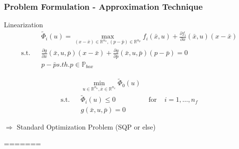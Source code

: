 \begin{frame}
	\frametitle{Problem Formulation - Approximation Technique}

\begin{block}{Linearization}
	\begin{align*}
	&&&\tilde{\Phi}_{i}(u)=\max_{(x-\bar{x})\in\mathbb{R}^{n_{x}}, (p-\bar{p})\in\mathbb{R}^{n_{p}}} f_{i}(\bar{x}, u)+\frac{\partial f_{i}}{\partial x}(\bar{x}, u)(x-\bar{x})\\
	&\text{s.t.} && \frac{\partial g}{\partial x}(\bar{x}, u, \bar{p})(x-\bar{x})+\frac{\partial g}{\partial p}(\bar{x}, u, \bar{p})(p-\bar{p})=0\\
	&&&p-\bar{p} s.th. p\in\mathbb{P}_{box}
	\end{align*}
	
\end{block}	
	

	
\begin{block}	

\begin{align*}
&&&\min_{u\in\mathbb{R}^{n_{u}}, \bar{x}\in\mathbb{R}^{n_{x}}} \tilde{\Phi}_{0}(u)\\
&\text{s.t.} &&  \tilde{\Phi}_{i}(u)\leq 0 & \text{ for } & i=1,\ldots,n_{f}\\
&&&g(\bar{x}, u, \bar{p})=0
\end{align*}
\end{block} 
	
$\Rightarrow$ Standard Optimization Problem (SQP or else)

\end{frame}
=======
